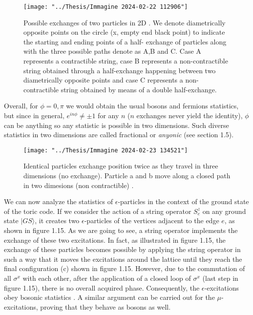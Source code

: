 \documentclass{Configuration_Files/PoliMi3i_thesis}
\begin{document}
\begin{figure}[H]
	\centering
	\texttt{[image: "../Thesis/Immagine 2024-02-22 112906"]}
	\caption{ { Possible exchanges of two particles in 2D \cite{Rao16}. We denote diametrically opposite points on the circle (x, empty end black point) to indicate the starting and ending points of a half- exchange of particles along with the three possible paths denote as A,B and C. Case A represents a contractible string, case B represents a non-contractible string obtained through a half-exchange happening between two diametrically opposite points and case C represents a non-contractible string obtained by means of a double half-exchange.}}
	\label{fig:immagine-2024-02-22-112906}
\end{figure}

Overall, for $ \phi = 0, \pi$ we would obtain the usual bosons and fermions statistics, but since in general, $e^{in\phi} \neq \pm 1$ for any $n$ ($n$ exchanges never yield the identity), $\phi$ can be anything so any statistic is possible in two dimensions.
Such diverse statistics in two dimensions are called fractional or \textit{anyonic} (see section 1.5).\newline


\begin{figure}
	\centering
	\texttt{[image: "../Thesis/Immagine 2024-02-23 134521"]}
	\caption{{ Identical particles exchange position twice as
			they travel in three dimensions (no exchange). Particle a and b move along a closed path in two dimesions (non contractible) \cite{Wil91}}.}
	\label{fig:immagine-2024-02-23-134521}
\end{figure}

We can now analyze the statistics of $\epsilon$-particles in the context of the ground state of the toric code. If we consider the action of a string operator $S^z_e$ on any ground state $|GS\rangle$, it creates two $\epsilon$-particles of the vertices adjacent to the edge $e$, as shown in figure 1.15. As we are going to see, a string operator implements the exchange of these two excitations. In fact, as illustrated in figure 1.15, the exchange of these particles becomes possible by applying the string operator in such a way that it moves the excitations around the lattice until they reach the final configuration (c) shown in figure 1.15. However, due to the commutation of all $\sigma^x$ with each other, after the application of a closed loop of $\sigma^x$ (last step in figure 1.15), there is no overall acquired phase. Consequently, the $\epsilon$-excitations obey bosonic statistics {\cite{Rao16, Her20}}. A similar argument can be carried out for the $\mu$-excitations, proving that they behave as bosons as well. 
\end{document}
